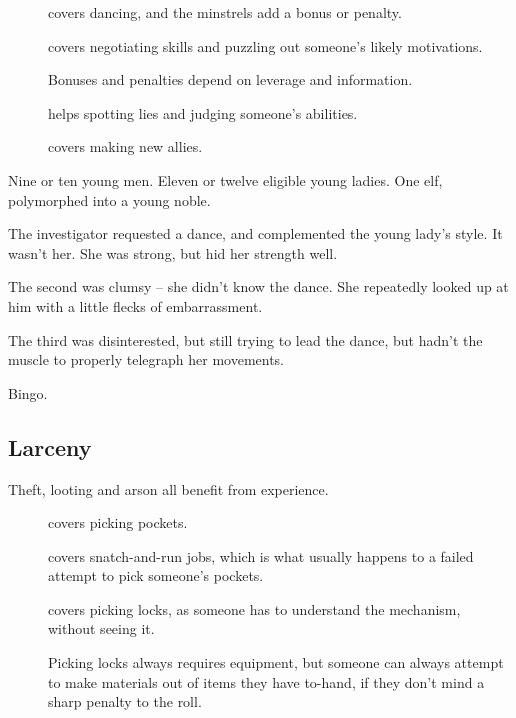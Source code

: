 \begin{multicols}{2}
\begin{description}
  \item[]
    covers dancing, and the minstrels add a bonus or penalty.
  \item[]
    covers negotiating skills and puzzling out someone's likely motivations.

    Bonuses and penalties depend on leverage and information.
  \item[]
    helps spotting lies and judging someone's abilities.
  \item[]
    covers making new allies.
\end{description}

\begin{exampletext}
  Nine or ten young men.
  Eleven or twelve eligible young ladies.
  One elf, polymorphed into a young noble.

  The investigator requested a dance, and complemented the young lady's style.
  It wasn't her.
  She was strong, but hid her strength well.

  The second was clumsy -- she didn't know the dance.
  She repeatedly looked up at him with a little flecks of embarrassment.

  The third was disinterested, but still trying to lead the dance, but hadn't the muscle to properly telegraph her movements.

  Bingo.
\end{exampletext}

\subsection{Larceny}

Theft, looting and arson all benefit from experience.

\begin{description}
  \item[]
    covers picking pockets.
  \item[]
    covers snatch-and-run jobs, which is what usually happens to a failed attempt to pick someone's pockets.
  \item[]
    covers picking locks, as someone has to understand the mechanism, without seeing it.

    Picking locks always requires equipment, but someone can always attempt to make materials out of items they have to-hand, if they don't mind a sharp penalty to the roll.


\end{description}
\end{multicols}
